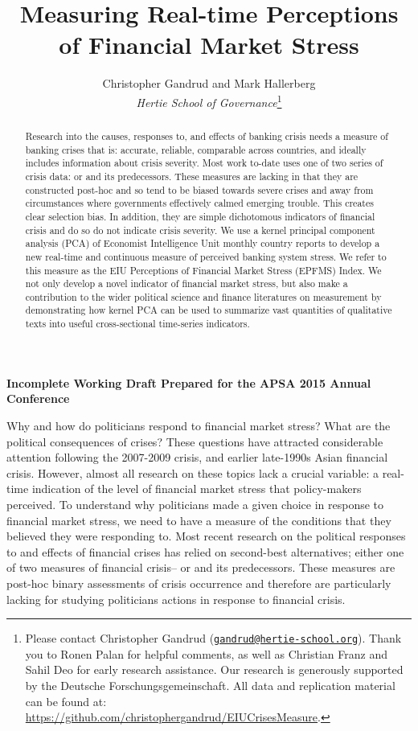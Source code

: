 \documentclass[]{article}
\title{Measuring Real-time Perceptions of Financial Market Stress}
\author{Christopher Gandrud and Mark Hallerberg \\ \emph{Hertie School of Governance}\footnote{Please contact Christopher Gandrud
(\href{mailto:gandrud@hertie-school.org}{\nolinkurl{gandrud@hertie-school.org}}).
Thank you to Ronen Palan for helpful comments, as well as Christian Franz and Sahil Deo for early research assistance. Our research is generously supported by the Deutsche Forschungsgemeinschaft. All data and replication material can be found at:
\url{https://github.com/christophergandrud/EIUCrisesMeasure}.}}
\begin{document}
\maketitle


\textbf{Incomplete Working Draft Prepared for the APSA 2015 Annual Conference}

\begin{abstract}
Research into the causes, responses to, and effects of banking crisis needs a measure of banking crises that is: accurate, reliable, comparable across countries, and ideally includes information about crisis severity. Most work to-date uses one of two series of crisis data: \cite{Reinhart2009,ReinhartRog2010} or \cite{laeven2013} and its predecessors. These measures are lacking in that they are constructed post-hoc and so tend to be biased towards severe crises and away from circumstances where governments effectively calmed emerging trouble. This creates clear selection bias. In addition, they are simple dichotomous indicators of financial crisis and do so do not indicate crisis severity. We use a kernel principal component analysis (PCA) of Economist Intelligence Unit monthly country reports to develop a new real-time and continuous measure of perceived banking system stress. We refer to this measure as the EIU Perceptions of Financial Market Stress (EPFMS) Index. We not only develop a novel indicator of financial market stress, but also make a contribution to the wider political science and finance literatures on measurement by demonstrating how kernel PCA can be used to summarize vast quantities of qualitative texts into useful cross-sectional time-series indicators.
\end{abstract}

Why and how do politicians respond to financial market stress? What are the political consequences of crises? These questions have attracted considerable attention following the
2007-2009 crisis, and earlier late-1990s Asian financial crisis. However, almost all research on these topics lack a crucial variable: a real-time indication of the level of financial
market stress that policy-makers perceived. To understand why politicians made a given choice in response to financial market stress, we need to have a measure of the conditions that they believed they were responding to. Most recent research on the political responses to and effects of financial crises has relied on second-best alternatives; either one of two measures of financial crisis--\cite{Reinhart2009,ReinhartRog2010} or \cite{laeven2013} and its predecessors. These measures are post-hoc binary assessments of crisis occurrence and therefore are particularly lacking for studying politicians actions in response to financial crisis.
\end{document}

